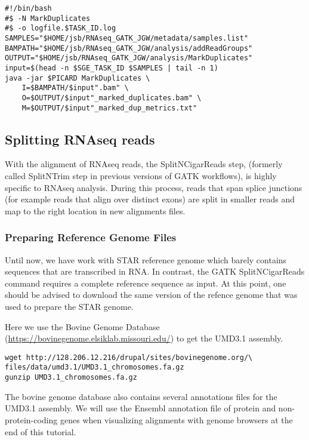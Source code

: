 \begin{verbatim}
#!/bin/bash
#$ -N MarkDuplicates
#$ -o logfile.$TASK_ID.log
SAMPLES="$HOME/jsb/RNAseq_GATK_JGW/metadata/samples.list"
BAMPATH="$HOME/jsb/RNAseq_GATK_JGW/analysis/addReadGroups"
OUTPUT="$HOME/jsb/RNAseq_GATK_JGW/analysis/MarkDuplicates"
input=$(head -n $SGE_TASK_ID $SAMPLES | tail -n 1)
java -jar $PICARD MarkDuplicates \
	I=$BAMPATH/$input".bam" \
	O=$OUTPUT/$input"_marked_duplicates.bam" \
	M=$OUTPUT/$input"_marked_dup_metrics.txt"
\end{verbatim}

\subsection{Splitting RNAseq reads}

With the alignment of RNAseq reads, the SplitNCigarReads step, (formerly called SplitNTrim step in previous versions of GATK workflows), is highly specific to RNAseq analysis. During this process, reads that span splice junctions (for example reads that align over distinct exons) are split in smaller reads and map to the right location in new alignments files.

\subsubsection{Preparing Reference Genome Files}

Until now, we have work with STAR reference genome which barely contains sequences that are transcribed in RNA. In contrast, the GATK SplitNCigarReads command requires a complete reference sequence as input. At this point, one should be advised to download the same version of the refence genome that was used to prepare the STAR genome.

Here we use the Bovine Genome Database (\href{https://bovinegenome.elsiklab.missouri.edu/}{https://bovinegenome.elsiklab.missouri.edu/}) to get the UMD3.1 assembly.

\begin{verbatim}
wget http://128.206.12.216/drupal/sites/bovinegenome.org/\
files/data/umd3.1/UMD3.1_chromosomes.fa.gz
gunzip UMD3.1_chromosomes.fa.gz
\end{verbatim}


The bovine genome database also contains several annotations files for the UMD3.1 assembly. We will use the Ensembl annotation file of protein and non-protein-coding genes when visualizing alignments with genome browsers at the end of this tutorial.

